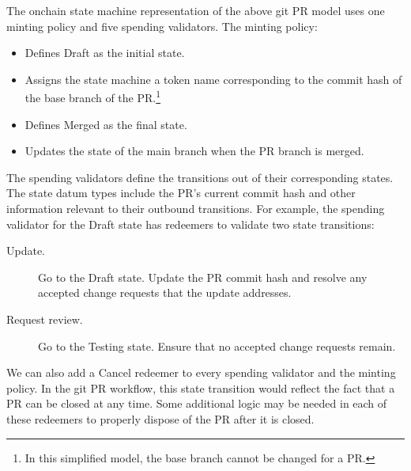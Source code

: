 \documentclass[../midgard.tex]{subfiles}
\begin{document}
The onchain state machine representation of the above git PR model uses one minting policy and five spending validators.
The minting policy:

\begin{itemize}
    \item Defines Draft as the initial state.
    \item Assigns the state machine a token name corresponding to the commit hash of the base branch of the PR.\footnote{In this simplified model, the base branch cannot be changed for a PR.}
    \item Defines Merged as the final state.
    \item Updates the state of the main branch when the PR branch is merged.
\end{itemize}

The spending validators define the transitions out of their corresponding states.
The state datum types include the PR's current commit hash and other information relevant to their outbound transitions.
For example, the spending validator for the Draft state has redeemers to validate two state transitions:
\begin{description}
    \item[Update.] Go to the Draft state.
      Update the PR commit hash and resolve any accepted change requests that the update addresses.
    \item[Request review.] Go to the Testing state.
      Ensure that no accepted change requests remain.
\end{description}

We can also add a Cancel redeemer to every spending validator and the minting policy.
In the git PR workflow, this state transition would reflect the fact that a PR can be closed at any time.
Some additional logic may be needed in each of these redeemers to properly dispose of the PR after it is closed.
\end{document}
